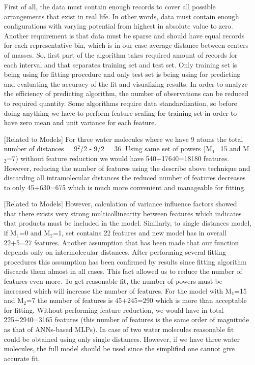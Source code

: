\documentclass[aps,prl,reprint,amsmath,amssymb,nature]{revtex4-1}
\begin{document}
First of all, the data must contain enough records to cover all possible arrangements that exist in real life. 
In other words, data must contain enough configurations with varying potential from highest in absolute value to zero. 
Another requirement is that data must be sparse and should have equal records for each representative bin, which is in our 
case average distance between centers of masses. 
So, first part of the algorithm takes required amount of records for each interval and that separates training set and test set. 
Only training set is being using for fitting procedure and only test set is being using for predicting and evaluating the accuracy of the fit and visualizing results. 
In order to analyze the efficiency of predicting algorithm, the number of observations can be reduced to required quantity. 
Some algorithms require data standardization, so before doing anything we have to perform feature scaling for training set in order to have zero mean and unit variance for each feature.

[Related to Models] For three water molecules where we have 9 atoms the total number of 
distances = 9$^{2}$/2 - 9/2 = 36. Using same set of powers (M$_{1
}$=15 and M$_{2}$=7) without feature reduction we would have 
540+17640=18180 features. However, reducing the number of features using 
the describe above technique and discarding all intramolecular distances 
the reduced number of features decreases to only 45+630=675 which is 
much more convenient and manageable for fitting.

[Related to Models] However, calculation of variance influence factors showed that there 
exists very strong multicollinearity between features which indicates 
that products must be included in the model. Similarly, to single 
distances model, if M$_{1}$=0 and M$_{2}$=1, set contains 22 
features and new model has in overall 22+5=27 features. Another 
assumption that has been made that our function depends only on 
intermolecular distances. After performing several fitting procedures 
this assumption has been confirmed by results since fitting algorithm 
discards them almost in all cases. This fact allowed us to reduce the 
number of features even more. To get reasonable fit, the number of 
powers must be increased which will increase the number of features. For 
the model with M$_{1}$=15 and M$_{2}$=7 the number of features 
is 45+245=290 which is more than acceptable for fitting. Without 
performing feature reduction, we would have in total 225+2940=3165 
features (this number of features is the same order of magnitude as that 
of ANNs-based MLPs). In case of two water molecules reasonable fit could 
be obtained using only single distances. However, if we have three water 
molecules, the full model should be used since the simplified one cannot 
give accurate fit. 
\end{document}
